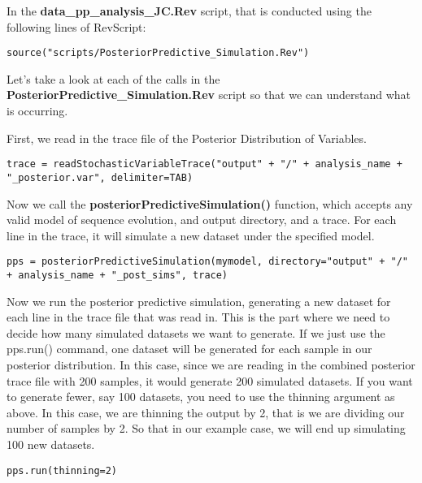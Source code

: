 In the \textbf{data\_pp\_analysis\_JC.Rev} script, that is conducted using the following lines of RevScript: 
{\tt \begin{Snugshade}[184,207,236]
\begin{lstlisting}
source("scripts/PosteriorPredictive_Simulation.Rev")
\end{lstlisting}
\end{Snugshade}}

Let's take a look at each of the calls in the \textbf{PosteriorPredictive\_Simulation.Rev} script so 
that we can understand what is occurring. 

First, we read in the trace file of the Posterior Distribution of Variables.
{\tt \begin{Snugshade}[184,207,236]
\begin{lstlisting}
trace = readStochasticVariableTrace("output" + "/" + analysis_name + "_posterior.var", delimiter=TAB)
\end{lstlisting}
\end{Snugshade}}

Now we call the \textbf{posteriorPredictiveSimulation()} function, which accepts any valid model of sequence evolution, and output directory, and a trace. For each line in the trace, it will simulate a new dataset under the specified model.
{\tt \begin{Snugshade}[184,207,236]
\begin{lstlisting}
pps = posteriorPredictiveSimulation(mymodel, directory="output" + "/" + analysis_name + "_post_sims", trace)
\end{lstlisting}
\end{Snugshade}}

Now we run the posterior predictive simulation, generating a new dataset for each line in the trace file 
that was read in. This is the part where we need to decide how many simulated datasets we want to generate.
If we just use the pps.run() command, one dataset will be generated for each sample in our posterior distribution.
In this case, since we are reading in the combined posterior trace file with 200 
samples, it would generate 200 simulated datasets. If you want to generate fewer, say 100 datasets,
you need to use the thinning argument as above. In this case, we are thinning the output by 2, that is
we are dividing our number of samples by 2. So that in our example case, we will end up simulating 100 
new datasets.
{\tt \begin{Snugshade}[184,207,236]
\begin{lstlisting}
pps.run(thinning=2)
\end{lstlisting}
\end{Snugshade}}


